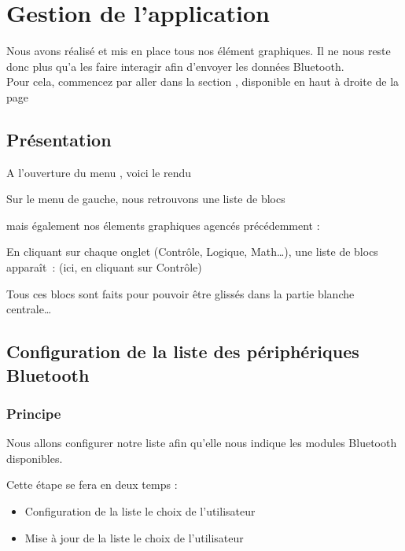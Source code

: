 \chapter{Gestion de l'application}



Nous avons réalisé et mis en place tous nos élément graphiques. Il ne nous reste donc plus qu'a les faire interagir afin d'envoyer les données Bluetooth. \\
\noindent
Pour cela, commencez par aller dans la section , disponible en haut à droite de la page


\newpage
\section{Présentation}
A l'ouverture du menu , voici le rendu

Sur le menu de gauche, nous retrouvons une liste de blocs 

 \label{place_menu_left}

mais également nos élements graphiques agencés précédemment : 


En cliquant sur chaque onglet (Contrôle, Logique, Math…), une liste de blocs apparaît :
(ici, en cliquant sur Contrôle)


Tous ces blocs sont faits pour pouvoir être glissés dans la partie blanche centrale…


\section{Configuration de la liste des périphériques Bluetooth}

\subsection{Principe}

Nous allons configurer notre liste  afin qu'elle nous indique les modules Bluetooth disponibles.

Cette étape se fera en deux temps : 

\begin{itemize}
    \item Configuration de la liste  le choix de l'utilisateur
    \item Mise à jour de la liste  le choix de l'utilisateur
\end{itemize}


